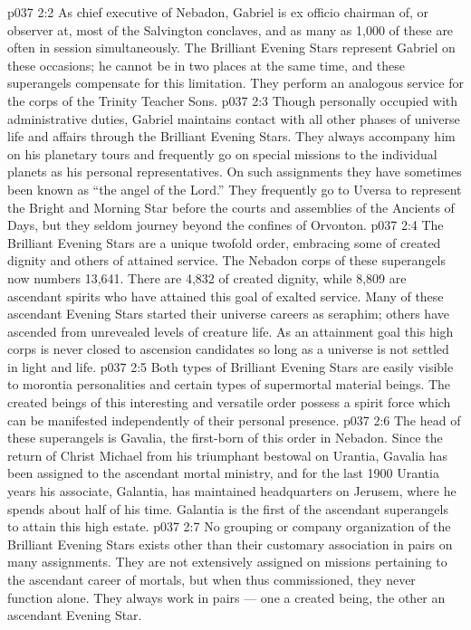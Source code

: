 \vs p037 2:2 As chief executive of Nebadon, Gabriel is ex officio chairman of, or observer at, most of the Salvington conclaves, and as many as 1,000 of these are often in session simultaneously. The Brilliant Evening Stars represent Gabriel on these occasions; he cannot be in two places at the same time, and these superangels compensate for this limitation. They perform an analogous service for the corps of the Trinity Teacher Sons.
\vs p037 2:3 Though personally occupied with administrative duties, Gabriel maintains contact with all other phases of universe life and affairs through the Brilliant Evening Stars. They always accompany him on his planetary tours and frequently go on special missions to the individual planets as his personal representatives. On such assignments they have sometimes been known as “the angel of the Lord.” They frequently go to Uversa to represent the Bright and Morning Star before the courts and assemblies of the Ancients of Days, but they seldom journey beyond the confines of Orvonton.
\vs p037 2:4 \pc The Brilliant Evening Stars are a unique twofold order, embracing some of created dignity and others of attained service. The Nebadon corps of these superangels now numbers 13,641. There are 4,832 of created dignity, while 8,809 are ascendant spirits who have attained this goal of exalted service. Many of these ascendant Evening Stars started their universe careers as seraphim; others have ascended from unrevealed levels of creature life. As an attainment goal this high corps is never closed to ascension candidates so long as a universe is not settled in light and life.
\vs p037 2:5 Both types of Brilliant Evening Stars are easily visible to morontia personalities and certain types of supermortal material beings. The created beings of this interesting and versatile order possess a spirit force which can be manifested independently of their personal presence.
\vs p037 2:6 \pc The head of these superangels is Gavalia, the first\hyp{}born of this order in Nebadon. Since the return of Christ Michael from his triumphant bestowal on Urantia, Gavalia has been assigned to the ascendant mortal ministry, and for the last 1900 Urantia years his associate, Galantia, has maintained headquarters on Jerusem, where he spends about half of his time. Galantia is the first of the ascendant superangels to attain this high estate.
\vs p037 2:7 No grouping or company organization of the Brilliant Evening Stars exists other than their customary association in pairs on many assignments. They are not extensively assigned on missions pertaining to the ascendant career of mortals, but when thus commissioned, they never function alone. They always work in pairs --- one a created being, the other an ascendant Evening Star.
